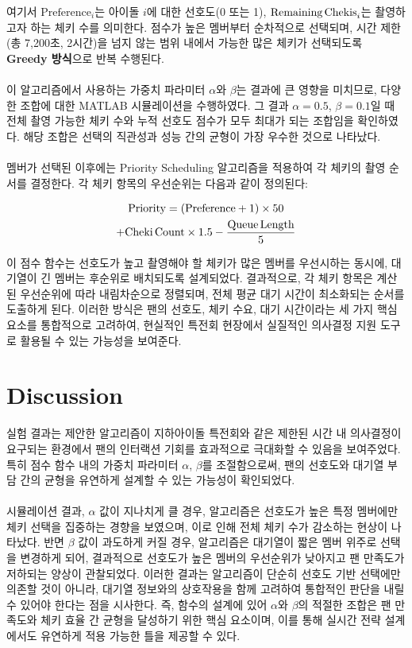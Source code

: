 \documentclass[12pt,hidelinks]{article}
\begin{document}
\noindent 여기서 $\text{Preference}_i$는 아이돌 $i$에 대한 선호도(0 또는 1), $\text{Remaining\,Chekis}_i$는 촬영하고자 하는 체키 수를 의미한다. 점수가 높은 멤버부터 순차적으로 선택되며, 시간 제한(총 7,200초, 2시간)을 넘지 않는 범위 내에서 가능한 많은 체키가 선택되도록 \textbf{Greedy 방식}으로 반복 수행된다.
\\
\\
이 알고리즘에서 사용하는 가중치 파라미터 $\alpha$와 $\beta$는 결과에 큰 영향을 미치므로, 다양한 조합에 대한 MATLAB 시뮬레이션을 수행하였다. 그 결과 $\alpha = 0.5$, $\beta = 0.1$일 때 전체 촬영 가능한 체키 수와 누적 선호도 점수가 모두 최대가 되는 조합임을 확인하였다. 해당 조합은 선택의 직관성과 성능 간의 균형이 가장 우수한 것으로 나타났다.
\\
\\
멤버가 선택된 이후에는 Priority Scheduling 알고리즘을 적용하여 각 체키의 촬영 순서를 결정한다. 각 체키 항목의 우선순위는 다음과 같이 정의된다:

\begin{multline*}
\displaystyle \text{Priority} = (\text{Preference} + 1) \times 50 \\
+ \text{Cheki\,Count} \times 1.5 - \frac{\text{Queue\,Length}}{5}
\end{multline*}

\noindent 이 점수 함수는 선호도가 높고 촬영해야 할 체키가 많은 멤버를 우선시하는 동시에, 대기열이 긴 멤버는 후순위로 배치되도록 설계되었다. 결과적으로, 각 체키 항목은 계산된 우선순위에 따라 내림차순으로 정렬되며, 전체 평균 대기 시간이 최소화되는 순서를 도출하게 된다. 이러한 방식은 팬의 선호도, 체키 수요, 대기 시간이라는 세 가지 핵심 요소를 통합적으로 고려하여, 현실적인 특전회 현장에서 실질적인 의사결정 지원 도구로 활용될 수 있는 가능성을 보여준다.

\section{Discussion}
실험 결과는 제안한 알고리즘이 지하아이돌 특전회와 같은 제한된 시간 내 의사결정이 요구되는 환경에서 팬의 인터랙션 기회를 효과적으로 극대화할 수 있음을 보여주었다. 특히 점수 함수 내의 가중치 파라미터 $\alpha$, $\beta$를 조절함으로써, 팬의 선호도와 대기열 부담 간의 균형을 유연하게 설계할 수 있는 가능성이 확인되었다. 
\\
\\
시뮬레이션 결과, $\alpha$ 값이 지나치게 클 경우, 알고리즘은 선호도가 높은 특정 멤버에만 체키 선택을 집중하는 경향을 보였으며, 이로 인해 전체 체키 수가 감소하는 현상이 나타났다. 반면 $\beta$ 값이 과도하게 커질 경우, 알고리즘은 대기열이 짧은 멤버 위주로 선택을 변경하게 되어, 결과적으로 선호도가 높은 멤버의 우선순위가 낮아지고 팬 만족도가 저하되는 양상이 관찰되었다. 이러한 결과는 알고리즘이 단순히 선호도 기반 선택에만 의존할 것이 아니라, 대기열 정보와의 상호작용을 함께 고려하여 통합적인 판단을 내릴 수 있어야 한다는 점을 시사한다. 즉, 함수의 설계에 있어 $\alpha$와 $\beta$의 적절한 조합은 팬 만족도와 체키 효율 간 균형을 달성하기 위한 핵심 요소이며, 이를 통해 실시간 전략 설계에서도 유연하게 적용 가능한 틀을 제공할 수 있다.
\end{document}
